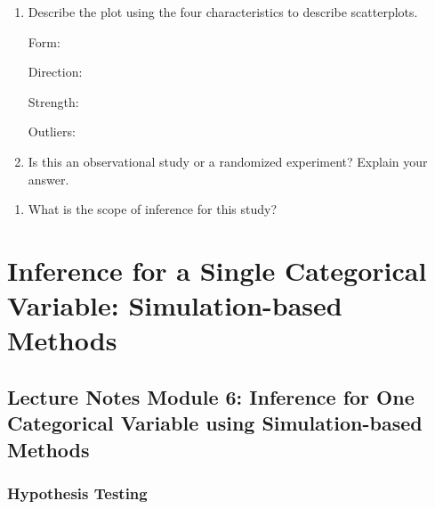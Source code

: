 \documentclass[
]{report}
\providecommand{\tightlist}{%
  \setlength{\itemsep}{0pt}\setlength{\parskip}{0pt}}
\begin{document}
\begin{enumerate}
\def\labelenumi{\alph{enumi}.}
\setcounter{enumi}{9}
\item
  Describe the plot using the four characteristics to describe scatterplots.
  \vspace{0.1in}

  Form:
  \vspace{0.2in}

  Direction:
  \vspace{0.2in}

  Strength:
  \vspace{0.2in}

  Outliers:
  \vspace{0.2in}
\item
  Is this an observational study or a randomized experiment? Explain your answer.
\end{enumerate}

\vspace{0.5in}

\begin{enumerate}
\def\labelenumi{\alph{enumi}.}
\setcounter{enumi}{11}
\tightlist
\item
  What is the scope of inference for this study?
\end{enumerate}

\newpage

\hypertarget{inference-for-a-single-categorical-variable-simulation-based-methods}{%
\chapter{Inference for a Single Categorical Variable: Simulation-based Methods}\label{inference-for-a-single-categorical-variable-simulation-based-methods}}

\hypertarget{lecture-notes-module-6-inference-for-one-categorical-variable-using-simulation-based-methods}{%
\section{Lecture Notes Module 6: Inference for One Categorical Variable using Simulation-based Methods}\label{lecture-notes-module-6-inference-for-one-categorical-variable-using-simulation-based-methods}}


\hypertarget{hypothesis-testing}{%
\subsection*{Hypothesis Testing}\label{hypothesis-testing}}
\end{document}

